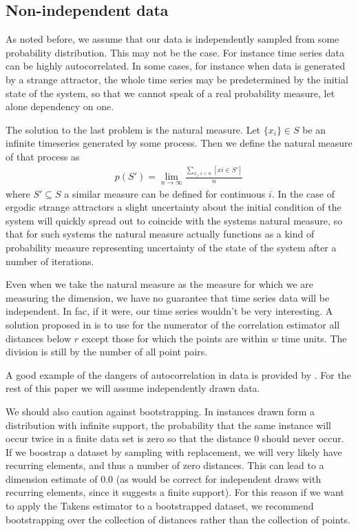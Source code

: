 \documentclass[11pt]{article}
\begin{document}
\subsection{Non-independent data}

As noted before, we assume that our data is independently sampled from some probability distribution. This may not be the case. For instance time series data can be highly autocorrelated. In some cases, for instance when data is generated by a strange attractor, the whole time series may be predetermined by the initial state of the system, so that we cannot speak of a real probability measure, let alone dependency on one.

The solution to the last problem is the natural measure. Let $\{x_i\} \in S$ be an infinite timeseries generated by some process. Then we define the natural measure of that process as
\begin{align*}
p(S') = \lim_{n \rightarrow \infty} \frac{\sum_{x_i, i < n} [xi \in S']}{n}
\end{align*} 
where $S' \subseteq S$ a similar measure can be defined for continuous $i$. In the case of ergodic strange attractors a slight uncertainty about the initial condition of the system will quickly spread out to coincide with the systems natural measure, so that for such systems the natural measure actually functions as a kind of probability measure representing uncertainty of the state of the system after a number of iterations.

Even when we take the natural measure as the measure for which we are measuring the dimension, we have no guarantee that time series data will be independent. In fac, if it were, our time series wouldn't be very interesting. A solution proposed in \cite{theiler1990estimating} is to use for the numerator of the correlation estimator all distances below $r$ except those for which the points are within $w$ time units. The division is still by the number of all point pairs.

A good example of the dangers of autocorrelation in data is provided by \cite{theiler1996re}. For the rest of this paper we will assume independently drawn data.

We should also caution against bootstrapping. In instances drawn form a distribution with infinite support, the probability that the same instance will occur twice in a finite data set is zero so that the distance 0 should never occur. If we boostrap a dataset by sampling with replacement, we will very likely have recurring elements, and thus a number of zero distances. This can lead to a dimension estimate of 0.0 (as would be correct for independent draws with recurring elements, since it suggests a finite support). For this reason if we want to apply the Takens estimator to a bootstrapped dataset, we recommend bootstrapping over the collection of distances rather than the collection of points. 
\end{document}
